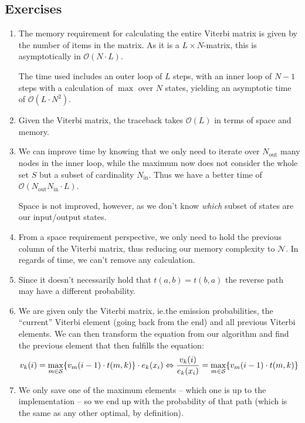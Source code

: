 \subsection*{Exercises}
\begin{enumerate}[label=(\alph*)]
\item The memory requirement for calculating the entire Viterbi matrix is
  given by the number of items in the matrix.  As it is a \(L\times N\)-matrix,
  this is asymptotically in \(\mathcal{O}(N\cdot L)\).

  The time used includes an outer loop of \(L\) steps, with an inner loop of
  \(N-1\) steps with a calculation of \(\max\) over \(N\) states, yielding an
  asymptotic time of \(\mathcal{O}(L\cdot N^2)\).
\item Given the Viterbi matrix, the traceback takes \(\mathcal{O}(L)\) in terms
  of space and memory.
\item We can improve time by knowing that we only need to iterate over
  \(N_\text{out}\) many nodes in the inner loop, while the maximum now does not
  consider the whole set \(S\) but a subset of cardinality \(N_\text{in}\).
  Thus we have a better time of \(\mathcal{O}(N_\text{out}N_\text{in}\cdot L)\).

  Space is not improved, however, as we don't know \emph{which} subset of states
  are our input/output states.
\item From a space requirement perspective, we only need to hold the previous
  column of the Viterbi matrix, thus reducing our memory complexity to
  \(\mathcal{N}\).  In regards of time, we can't remove any calculation.
\item Since it doesn't necessarily hold that \(t(a,b) = t(b,a)\) the reverse
  path may have a different probability.
\item We are given only the Viterbi matrix, ie.\@ the emission probabilities,
  the \enquote{current} Viterbi element (going back from the end) and all
  previous Viterbi elements.  We can then transform the equation from our
  algorithm and find the previous element that then fulfills the equation:
  \[
    v_k(i) = \max_{m\in\mathcal{S}} \{ v_m(i-1) \cdot t(m,k) \} \cdot e_k(x_i)
    \Leftrightarrow
    \frac{v_k(i)}{e_k(x_i)} = \max_{m\in\mathcal{S}} \{ v_m(i-1) \cdot t(m,k) \}
  \]
\item We only save one of the maximum elements -- which one is up to the
  implementation -- so we end up with the probability of that path (which is
  the same as any other optimal, by definition).
\end{enumerate}

